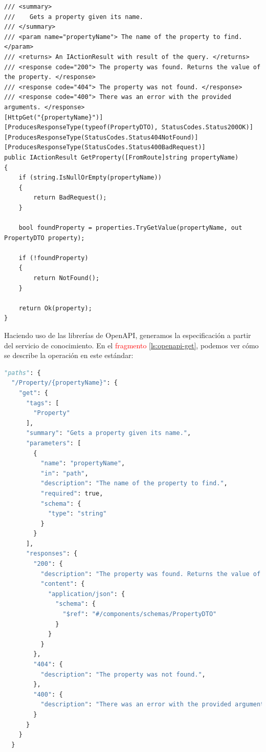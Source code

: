 \begin{lstlisting}[language={[Sharp]C},caption={Implementación del método GetProperty decorado para generar la especificación OpenAPI.},captionpos=b, label=ls:csharp-get]
/// <summary>
///    Gets a property given its name.
/// </summary>
/// <param name="propertyName"> The name of the property to find. </param>
/// <returns> An IActionResult with result of the query. </returns>
/// <response code="200"> The property was found. Returns the value of the property. </response>
/// <response code="404"> The property was not found. </response>
/// <response code="400"> There was an error with the provided arguments. </response>
[HttpGet("{propertyName}")]
[ProducesResponseType(typeof(PropertyDTO), StatusCodes.Status200OK)]
[ProducesResponseType(StatusCodes.Status404NotFound)]
[ProducesResponseType(StatusCodes.Status400BadRequest)]
public IActionResult GetProperty([FromRoute]string propertyName)
{
    if (string.IsNullOrEmpty(propertyName))
    {
        return BadRequest();
    }

    bool foundProperty = properties.TryGetValue(propertyName, out PropertyDTO property);

    if (!foundProperty)
    {
        return NotFound();
    }

    return Ok(property);
}
\end{lstlisting}

Haciendo uso de las librerías de OpenAPI, generamos la especificación a partir del servicio de conocimiento. En el \textcolor{red}{fragmento} \ref{ls:openapi-get}, podemos ver cómo se describe la operación en este estándar:

\begin{lstlisting}[language=python,caption={Especificación OpenAPI del método para obtener una propiedad del conocimiento (\lstinline{GetProperty}).},captionpos=b, label=ls:openapi-get]
"paths": {
  "/Property/{propertyName}": {
    "get": {
      "tags": [
        "Property"
      ],
      "summary": "Gets a property given its name.",
      "parameters": [
        {
          "name": "propertyName",
          "in": "path",
          "description": "The name of the property to find.",
          "required": true,
          "schema": {
            "type": "string"
          }
        }
      ],
      "responses": {
        "200": {
          "description": "The property was found. Returns the value of the property.",
          "content": {
            "application/json": {
              "schema": {
                "$ref": "#/components/schemas/PropertyDTO"
              }
            }
          }
        },
        "404": {
          "description": "The property was not found.",
        },
        "400": {
          "description": "There was an error with the provided arguments.",
        }
      }
    }
  }
\end{lstlisting}

